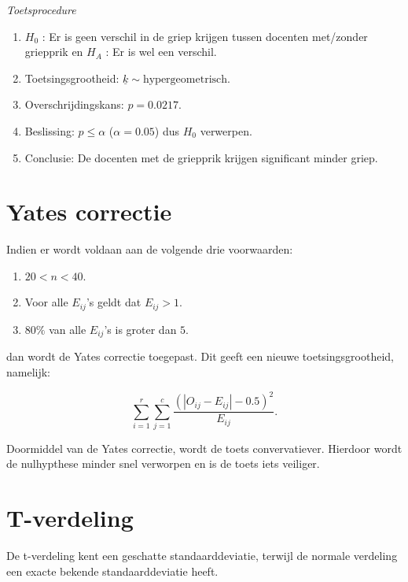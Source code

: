 \documentclass[11pt]{article}
\providecommand{\tightlist}{%
      \setlength{\itemsep}{0pt}\setlength{\parskip}{0pt}}
\begin{document}
    
    \emph{Toetsprocedure}

\begin{enumerate}
\def\labelenumi{\arabic{enumi}.}
\tightlist
\item
  \(H_0\) : Er is geen verschil in de griep krijgen tussen docenten
  met/zonder griepprik en \(H_A\) : Er is wel een verschil.
\item
  Toetsingsgrootheid: \(\underline{k} \sim \textrm{hypergeometrisch}\).
\item
  Overschrijdingskans: \(p = 0.0217\).
\item
  Beslissing: \(p \leq \alpha\) (\(\alpha=0.05\)) dus \(H_0\) verwerpen.
\item
  Conclusie: De docenten met de griepprik krijgen significant minder
  griep.
\end{enumerate}

    \hypertarget{yates-correctie}{%
\section{Yates correctie}\label{yates-correctie}}

    Indien er wordt voldaan aan de volgende drie voorwaarden:

\begin{enumerate}
\def\labelenumi{\arabic{enumi}.}
\tightlist
\item
  \(20 < n < 40\).
\item
  Voor alle \(E_{ij}\)'s geldt dat \(E_{ij} > 1\).
\item
  \(80\%\) van alle \(E_{ij}\)'s is groter dan \(5\).
\end{enumerate}

dan wordt de Yates correctie toegepast. Dit geeft een nieuwe
toetsingsgrootheid, namelijk:

\[ \sum\limits_{i=1}^r \sum\limits_{j=1}^c \dfrac{\left(\left| O_{ij} - E_{ij}\right| - 0.5\right)^2 }{E_{ij}}. \]

Doormiddel van de Yates correctie, wordt de toets convervatiever.
Hierdoor wordt de nulhypthese minder snel verworpen en is de toets iets
veiliger.

    \hypertarget{t-verdeling}{%
\section{T-verdeling}\label{t-verdeling}}

    De t-verdeling kent een geschatte standaarddeviatie, terwijl de normale
verdeling een exacte bekende standaarddeviatie heeft.
\end{document}
